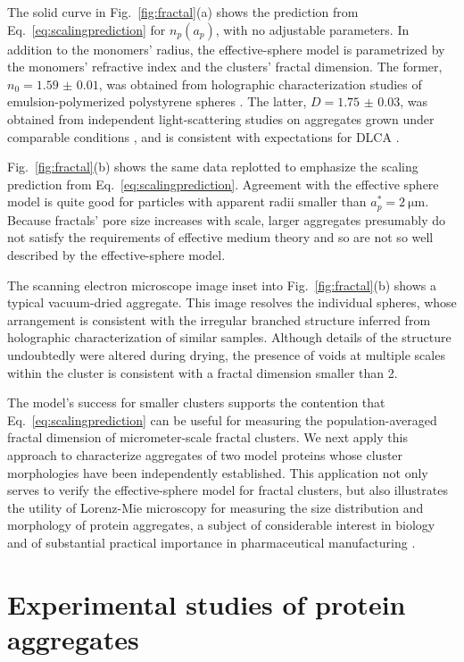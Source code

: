 The solid curve in Fig.~\ref{fig:fractal}(a) shows the prediction from
Eq.~\eqref{eq:scalingprediction} for $n_p(a_p)$, with no adjustable
parameters.
In addition to the monomers' radius, the effective-sphere model
is parametrized by the monomers' refractive index and the
clusters' fractal dimension.
The former, $n_0 = \num{1.59(1)}$, was obtained from
holographic characterization studies
of emulsion-polymerized polystyrene spheres
\cite{lee07a,cheong09,xiao10a,cheong11}.
The latter, $D = \num{1.75(3)}$, was obtained from 
independent light-scattering
studies on aggregates grown under comparable conditions
\cite{aubert86,majolino89,zhou91,sorensen01,wu13}, and
is consistent with expectations for DLCA \cite{weitz85,sorensen01}.

Fig.~\ref{fig:fractal}(b) shows the same data replotted to emphasize
the scaling prediction from Eq.~\eqref{eq:scalingprediction}.
Agreement with the effective sphere model is quite good
for particles with apparent radii smaller than 
$a_p^\ast = \SI{2}{\um}$.
Because fractals' pore size increases with scale, larger aggregates
presumably do not satisfy the requirements of effective medium
theory and so are not so well described by the effective-sphere model.

The scanning electron microscope image inset into
Fig.~\ref{fig:fractal}(b) shows a typical vacuum-dried
aggregate.  This image resolves the individual spheres,
whose arrangement is consistent with the irregular branched
structure inferred from holographic characterization of
similar samples.  Although details of the structure undoubtedly
were altered during drying, the presence of voids at multiple
scales within the cluster is consistent with a fractal dimension
smaller than \num{2}.

The model's success for smaller clusters supports the contention
that Eq.~\eqref{eq:scalingprediction} can be useful
for measuring the population-averaged fractal
dimension of micrometer-scale fractal clusters.
We next apply this approach to characterize aggregates of
two model proteins whose cluster morphologies have
been independently established.
This application not only serves to verify the effective-sphere
model for fractal clusters, 
but also illustrates the utility of Lorenz-Mie
microscopy for measuring the size distribution and morphology
of protein aggregates, a subject of considerable interest in
biology \cite{morris09}
and of substantial practical importance in pharmaceutical manufacturing \cite{wang99a}.

\section{Experimental studies of protein aggregates}
\label{sec:protein}

